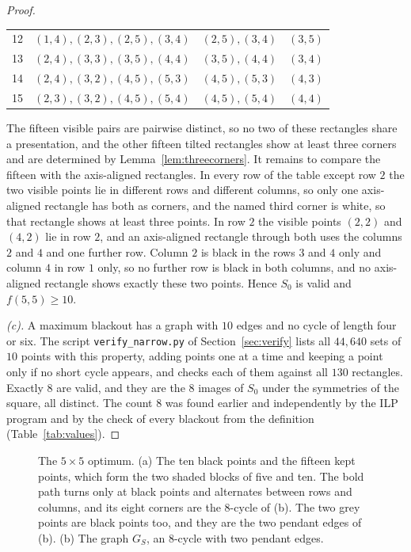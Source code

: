 \begin{proof}
\begin{center}
\begin{tabular}{@{}rlll@{}}
12 & $(1,4),(2,3),(2,5),(3,4)$ & $(2,5),(3,4)$ & $(3,5)$ \\
13 & $(2,4),(3,3),(3,5),(4,4)$ & $(3,5),(4,4)$ & $(3,4)$ \\
14 & $(2,4),(3,2),(4,5),(5,3)$ & $(4,5),(5,3)$ & $(4,3)$ \\
15 & $(2,3),(3,2),(4,5),(5,4)$ & $(4,5),(5,4)$ & $(4,4)$ \\
\bottomrule
\end{tabular}
\end{center}
The fifteen visible pairs are pairwise distinct, so no two of these rectangles share a
presentation, and the other fifteen tilted rectangles show at least three corners and are
determined by Lemma~\ref{lem:threecorners}. It remains to compare the fifteen with the
axis-aligned rectangles. In every row of the table except row $2$ the two visible points lie
in different rows and different columns, so only one axis-aligned rectangle has both as
corners, and the named third corner is white, so that rectangle shows at least three points.
In row $2$ the visible points $(2,2)$ and $(4,2)$ lie in row $2$, and an axis-aligned
rectangle through both uses the columns $2$ and $4$ and one further row. Column $2$ is black
in the rows $3$ and $4$ only and column $4$ in row $1$ only, so no further row is black in
both columns, and no axis-aligned rectangle shows exactly these two points. Hence $S_0$ is
valid and $f(5,5)\ge10$.

\emph{(c).} A maximum blackout has a graph with $10$ edges and no cycle of length four or
six. The script \texttt{verify\_narrow.py} of Section~\ref{sec:verify} lists all $44{,}640$
sets of $10$ points with this property, adding points one at a time and keeping a point only
if no short cycle appears, and checks each of them against all $130$ rectangles. Exactly $8$
are valid, and they are the $8$ images of $S_0$ under the symmetries of the square, all
distinct. The count $8$ was found earlier and independently by the ILP program and by the
check of every blackout from the definition (Table~\ref{tab:values}).
\end{proof}

\begin{figure}[t]
\centering

\caption{The $5\times5$ optimum. (a) The ten black points and the fifteen kept points, which
form the two shaded blocks of five and ten. The bold path turns only at black points and
alternates between rows and columns, and its eight corners are the $8$-cycle of (b). The two
grey points are black points too, and they are the two pendant edges of (b). (b) The graph
$G_S$, an $8$-cycle with two pendant edges.}
\label{fig:fivefive}
\end{figure}

